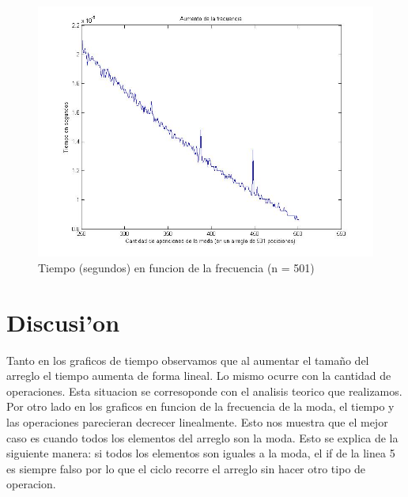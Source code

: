 \begin{figure}[H]
\centering
\includegraphics[scale=0.5]{../../codigo/ejercicio3/benchmark-de-tiempo/graficos/aumento-frecuencia.jpg}
\caption{Tiempo (segundos) en funcion de la frecuencia (n = 501)}
\end{figure}

\section{Discusi'on}
Tanto en los graficos de tiempo observamos que al aumentar el tama\~{n}o del arreglo el tiempo aumenta de forma lineal. Lo mismo ocurre con la cantidad de operaciones. Esta situacion se corresoponde con el analisis teorico que realizamos.
Por otro lado en los graficos en funcion de la frecuencia de la moda, el tiempo y las operaciones parecieran decrecer linealmente. Esto nos muestra que el mejor caso es cuando todos los elementos del arreglo son la moda. Esto se explica de la siguiente manera: si todos los elementos son iguales a la moda, el if de la linea 5 es siempre falso por lo que el ciclo recorre el arreglo sin hacer otro tipo de operacion.
